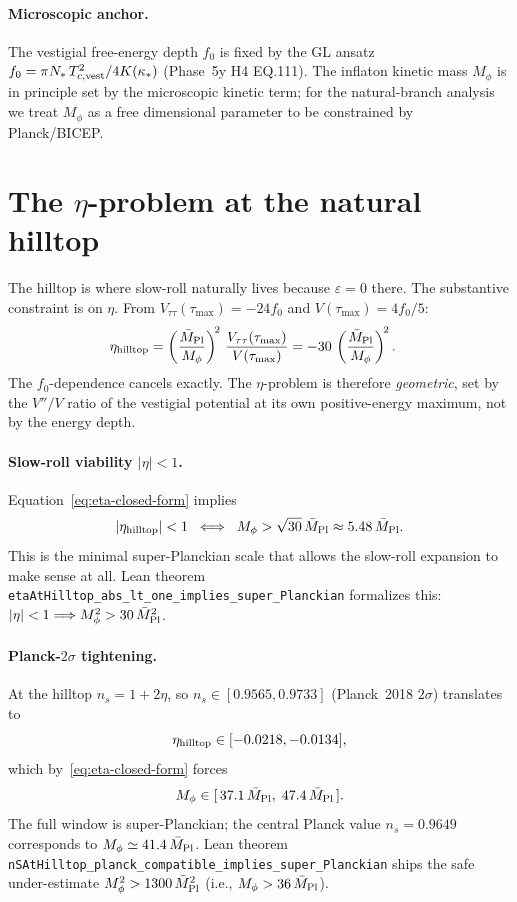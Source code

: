 \documentclass[twocolumn]{revtex4-2}
\newcommand{\Mpl}{\bar M_{\rm Pl}}
\newcommand{\Mphi}{M_\phi}
\newcommand{\fzero}{f_0}
\newcommand{\nS}{n_s}
\newcommand{\eps}{\varepsilon}
\begin{document}
\paragraph{Microscopic anchor.}
The vestigial free-energy depth $\fzero$ is fixed by the GL ansatz
$\fzero = \pi N_*\,T_{c,{\rm vest}}^2 / 4K(\kappa_*)$ (Phase~5y H4
EQ.111). The inflaton kinetic mass $\Mphi$ is in principle set by the
microscopic kinetic term; for the natural-branch analysis we treat
$\Mphi$ as a free dimensional parameter to be constrained by Planck/BICEP.

\section{The $\eta$-problem at the natural hilltop}
\label{sec:eta}

The hilltop is where slow-roll naturally lives because $\eps=0$ there.
The substantive constraint is on $\eta$. From
$V_{\tau\tau}(\tau_{\max}) = -24\fzero$ and $V(\tau_{\max}) = 4\fzero/5$:
\begin{align}
\eta_{\rm hilltop}
   &= \left(\frac{\Mpl}{\Mphi}\right)^{\!2}\,
      \frac{V_{\tau\tau}(\tau_{\max})}{V(\tau_{\max})}
   = -30\,\left(\frac{\Mpl}{\Mphi}\right)^{\!2}.
\label{eq:eta-closed-form}
\end{align}
The $\fzero$-dependence cancels exactly. The $\eta$-problem is therefore
\emph{geometric}, set by the $V''/V$ ratio of the vestigial potential at
its own positive-energy maximum, not by the energy depth.

\paragraph{Slow-roll viability $|\eta|<1$.} Equation~\eqref{eq:eta-closed-form}
implies
\begin{equation}
|\eta_{\rm hilltop}| < 1
\;\;\Longleftrightarrow\;\;
\Mphi > \sqrt{30}\,\Mpl \approx 5.48\,\Mpl.
\end{equation}
This is the minimal super-Planckian scale that allows the slow-roll
expansion to make sense at all. Lean theorem
\texttt{etaAtHilltop\_abs\_lt\_one\_implies\_super\_Planckian}
formalizes this: $|\eta|<1 \Longrightarrow \Mphi^2 > 30\,\Mpl^2$.

\paragraph{Planck-$2\sigma$ tightening.} At the hilltop $\nS = 1 + 2\eta$,
so $\nS \in [0.9565, 0.9733]$ (Planck~2018 $2\sigma$) translates to
\begin{equation}
\eta_{\rm hilltop} \in [-0.0218, -0.0134],
\end{equation}
which by~\eqref{eq:eta-closed-form} forces
\begin{equation}
\Mphi \in [\,37.1\,\Mpl,\;47.4\,\Mpl\,].
\label{eq:Mphi-window}
\end{equation}
The full window is super-Planckian; the central Planck value
$\nS = 0.9649$ corresponds to $\Mphi \simeq 41.4\,\Mpl$.
Lean theorem \texttt{nSAtHilltop\_planck\_compatible\_implies\_super\_Planckian}
ships the safe under-estimate $\Mphi^2 > 1300\,\Mpl^2$ (i.e.,
$\Mphi > 36\,\Mpl$).
\end{document}
